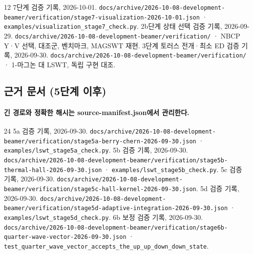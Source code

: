 \begin{thebibliography}{12}
      7단계 검증 기록, 2026-10-01.
      \newblock \texttt{docs/archive/2026-10-08-development-beamer/verification/stage7-visualization-2026-10-01.json} · \texttt{examples/visualization\_stage7\_check.py}.
      2b단계 상태 선택 검증 기록, 2026-09-29.
      \newblock \texttt{docs/archive/2026-10-08-development-beamer/verification/} · NBCP Y·V 선택, 대조군, 벤치마크, MAGSWT 재현.
      3단계 토러스 전개·최소 ED 검증 기록, 2026-09-30.
      \newblock \texttt{docs/archive/2026-10-08-development-beamer/verification/} · 1-마그논 대 LSWT, 독립 구현 대조.
  \end{thebibliography}
\endgroup


\subsection{근거 문서 (5단계 이후)}\label{sources-stage5}
\begingroup%
  \framesubtitle{긴 경로와 정확한 해시는 source-manifest.json에서 관리한다.}
  \small
  \begin{thebibliography}{24}
    \setcounter{enumiv}{20}
      5a 검증 기록, 2026-09-30.
      \newblock \texttt{docs/archive/2026-10-08-development-beamer/verification/stage5a-berry-chern-2026-09-30.json} · \texttt{examples/lswt\_stage5a\_check.py}.
      5b 검증 기록, 2026-09-30.
      \newblock \texttt{docs/archive/2026-10-08-development-beamer/verification/stage5b-thermal-hall-2026-09-30.json} · \texttt{examples/lswt\_stage5b\_check.py}.
      5c 검증 기록, 2026-09-30.
      \newblock \texttt{docs/archive/2026-10-08-development-beamer/verification/stage5c-hall-kernel-2026-09-30.json}.
      5d 검증 기록, 2026-09-30.
      \newblock \texttt{docs/archive/2026-10-08-development-beamer/verification/stage5d-adaptive-integration-2026-09-30.json} · \texttt{examples/lswt\_stage5d\_check.py}.
      6b 보정 검증 기록, 2026-09-30.
      \newblock \texttt{docs/archive/2026-10-08-development-beamer/verification/stage6b-quarter-wave-vector-2026-09-30.json} · \texttt{test\_quarter\_wave\_vector\_accepts\_the\_up\_up\_down\_down\_state}.
  \end{thebibliography}
\endgroup

